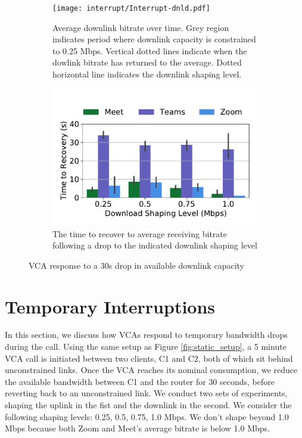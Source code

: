 
\begin{figure}[h!]
\begin{subfigure}[t]{.5\textwidth}
   \centering
    \texttt{[image: interrupt/Interrupt-dnld.pdf]}
    \captionsetup{width=.9\linewidth}
    \caption{Average downlink bitrate over time. Grey region indicates period where downlink capacity is constrained to 0.25 Mbps. Vertical dotted lines indicate when the dowlink bitrate has returned to the average. Dotted horizontal line indicates the downlink shaping level.}
    \label{fig:ts-dnld}
\end{subfigure}
\begin{subfigure}[t]{.5\textwidth}
  \centering
    \includegraphics[width=1\textwidth,keepaspectratio]{../figures/interrupt/TTR-dnld.pdf}
    \captionsetup{width=.9\linewidth}
    \caption{The time to recover to average receiving bitrate following a drop to the indicated downlink shaping level}
    \label{fig:TTR_dnld}
\end{subfigure}
\caption{VCA response to a 30s drop in available downlink capacity}
\label{fig:interrupt-dnld}
\end{figure}

\section{Temporary Interruptions}
\label{sec:interruption}

In this section, we discuss how VCAs respond to temporary bandwidth drops during the call. Using the same setup as Figure \ref{fig:static_setup}, a 5 minute VCA call is initiated between two clients, C1 and C2, both of which sit behind unconstrained links. Once the VCA reaches its nominal consumption, we reduce the available bandwidth between C1 and the router for 30 seconds, before reverting back to an unconstrained link. We conduct two sets of experiments, shaping the uplink in the fist and the downlink in the second. We consider the following shaping levels: {0.25, 0.5, 0.75, 1.0} Mbps. We don't shape beyond 1.0 Mbps because both Zoom and Meet's average bitrate is below 1.0 Mbps.


